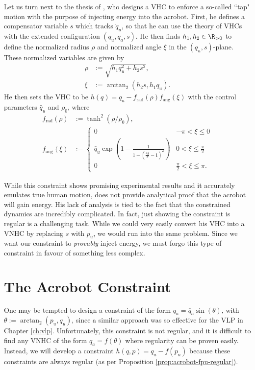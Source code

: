 Let us turn next to the thesis of \citet{xingbo_thesis}, who designs a VHC to enforce a
so-called ``tap" motion with the purpose of injecting energy into the acrobot. 
First, he defines a compensator variable \(s\) which tracks \(\dot{q}_u\), so
that he can use the theory of VHCs with the extended configuration 
\((q_u,q_a,s)\).
He then finds \(h_1, h_2 \in \R_{>0}\) to define the
normalized radius \(\rho\) and normalized angle \(\xi\) in the
\((q_u, s)\)-plane.
These normalized variables are given by
\begin{align*}
    \rho &:= \sqrt{h_1 q_u^2 + h_2 s^2}
    , \\
    \xi &:= \arctan_2(h_2 s, h_1 q_u)
    . 
\end{align*}
He then sets the VHC to be \(h(q) = q_a - f_\text{rad}(\rho)f_\text{ang}(\xi)\)
with the control parameters \(\bar{q}_u\) and \(\rho_0\), where
\begin{align}
    \label{eqn:xingbo-frad}
    f_\text{rad}(\rho) &:= \tanh^2(\rho/\rho_0)
    , \\
    \label{eqn:xingbo-fang}
    f_\text{ang}(\xi) &:= 
    \begin{cases}
        0 & -\pi < \xi \leq 0 \\
        \bar{q}_u \exp\left(1 - \frac{1}{1-(\frac{4\xi}{\pi} - 1)^2}\right) 
          & 0 < \xi \leq \frac{\pi}{2} \\
        0 & \frac{\pi}{2} < \xi \leq \pi
        .
    \end{cases}
\end{align}

While this constraint shows promising experimental results and it accurately
emulates true human motion, \citeauthor{xingbo_thesis}
does not provide analytical proof that the acrobot will gain energy.
His lack of analysis is tied to the fact that the constrained
dynamics are incredibly complicated.
In fact, just showing the constraint is regular is a challenging task.
While we could very easily convert his VHC into a VNHC by replacing \(s\) with
\(p_u\), we would run into the same problem. 
Since we want our constraint to \textit{provably} inject energy, we must forgo
this type of constraint in favour of something less complex.

\section{The Acrobot Constraint}
One may be tempted to design a constraint of the form 
\(q_a = \bar{q}_a\sin(\theta)\),
with \(\theta := \arctan_2(p_u,q_u)\), since a similar approach 
was so effective for the VLP in Chapter \ref{ch:vlp}.
Unfortunately, this constraint is not regular, and it is difficult to find any
VNHC of the form \(q_a = f(\theta)\) where regularity can be proven easily.
Instead, we will develop a constraint \(h(q,p) = q_a - f(p_u)\) because these
constraints are always regular (as per Proposition \ref{prop:acrobot-fpu-regular}). 
 
